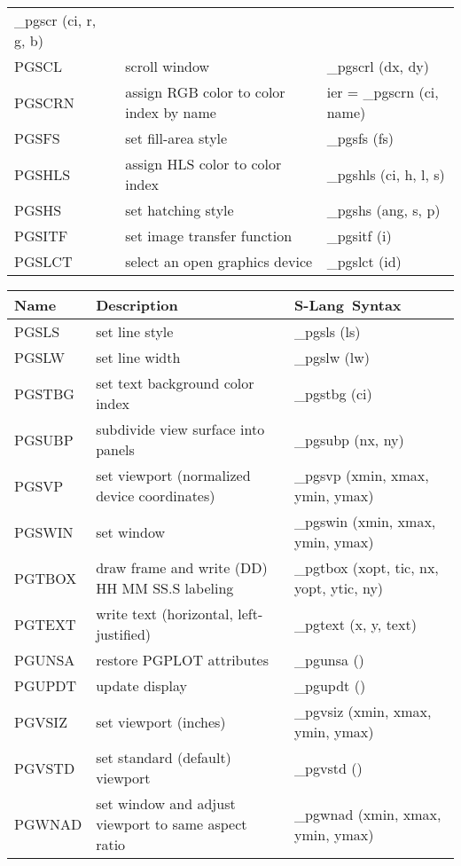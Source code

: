 \documentclass{book}
\newcommand{\slang}{{\sc S-Lang}}
\begin{document}
{\begin{center}
\begin{tabular}{|l|p{2.5in}|p{2.25in}|}
\_pgscr (ci, r, g, b) \\
PGSCL & scroll window                    &
\_pgscrl (dx, dy) \\
PGSCRN & assign RGB color to color index by name               &
ier = \_pgscrn (ci, name) \\
PGSFS & set fill-area style                                             &
\_pgsfs (fs) \\
PGSHLS & assign HLS color to color index                          &
\_pgshls (ci, h, l, s) \\
PGSHS & set hatching style                                              &
\_pgshs (ang, s, p) \\
PGSITF & set image transfer function                                    &
\_pgsitf (i) \\
PGSLCT & select an open graphics device                                 &
\_pgslct (id) \\
\hline
\end{tabular}

\begin{tabular}{|l|p{2.5in}|p{2.25in}|}
\hline
Name &  Description & \slang\ Syntax \\
\hline
\hline
PGSLS & set line style                                                  &
\_pgsls (ls) \\
PGSLW & set line width                                                  &
\_pgslw (lw) \\
PGSTBG & set text background color index                                &
\_pgstbg (ci) \\
PGSUBP & subdivide view surface into panels                             &
\_pgsubp (nx, ny) \\
PGSVP & set viewport (normalized device coordinates)                    &
\_pgsvp (xmin, xmax, ymin, ymax) \\
PGSWIN & set window                                                     &
\_pgswin (xmin, xmax, ymin, ymax) \\
PGTBOX & draw frame and write (DD) HH MM SS.S labeling                 &
\_pgtbox (xopt, tic, nx, yopt, ytic, ny) \\
PGTEXT & write text (horizontal, left-justified)                        &
\_pgtext (x, y, text) \\
PGUNSA & restore PGPLOT attributes                                      &
\_pgunsa () \\
PGUPDT & update display                                                 &
\_pgupdt () \\
PGVSIZ & set viewport (inches)                                          &
\_pgvsiz (xmin, xmax, ymin, ymax) \\
PGVSTD & set standard (default) viewport                                &
\_pgvstd () \\
PGWNAD & set window and adjust viewport to same aspect ratio            &
\_pgwnad (xmin, xmax, ymin, ymax) \\
\hline
\end{tabular}
\end{center}

}
\end{document}
